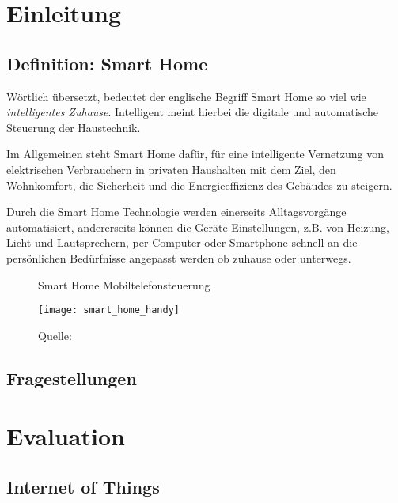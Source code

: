 \section{Einleitung}

\subsection{Definition: Smart Home} %

Wörtlich übersetzt, bedeutet der englische Begriff Smart Home so viel wie \textit{intelligentes Zuhause}. Intelligent meint hierbei die digitale und automatische Steuerung der Haustechnik.

Im Allgemeinen steht Smart Home dafür, für eine intelligente Vernetzung von elektrischen Verbrauchern in privaten Haushalten mit dem Ziel, den Wohnkomfort, die Sicherheit und die Energieeffizienz des Gebäudes zu steigern.

Durch die Smart Home Technologie werden einerseits Alltagsvorgänge automatisiert, andererseits können die Geräte-Einstellungen, z.B. von Heizung, Licht und Lautsprechern, per Computer oder Smartphone schnell an die persönlichen Bedürfnisse angepasst werden ob zuhause oder unterwegs.


\begin{figure}[ht] %
	\centering
	\caption{Smart Home Mobiltelefonsteuerung}
	\texttt{[image: smart\_home\_handy]}
	\caption*{\footnotesize{Quelle: }}
	\label{fig:smarthomehandy}
\end{figure}

\subsection{Fragestellungen} %


\section{Evaluation}

\subsection{Internet of Things}

